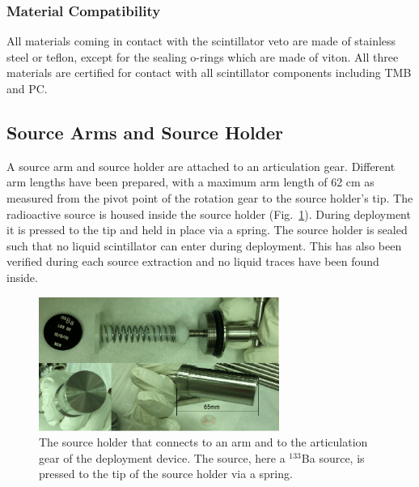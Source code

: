 \subsubsection*{Material Compatibility}
All materials coming in contact with the scintillator veto are made of stainless steel or teflon, except for the sealing o-rings which are made of viton. All three materials are certified for contact with all scintillator components including TMB and PC.

\subsection{Source Arms and Source Holder}
A source arm and source holder are attached to an articulation gear. Different arm lengths have been prepared, with a maximum arm length of 62 cm as measured from the pivot point of the rotation gear to the source holder's tip. The radioactive source is housed inside the source holder (Fig.~\ref{fig:SourceHolder}). During deployment it is pressed to the tip and held in place via a spring. The source holder is sealed such that no liquid scintillator can enter during deployment. This has also been verified during each source extraction and no liquid traces have been found inside.

\begin{figure}[htbp]
 \centering
  \includegraphics[width=0.7\textwidth]{Figures/SourceHolder.png}
  \caption{The source holder that connects to an arm and to the articulation gear of the deployment device. The source, here a $^{133}$Ba source, is pressed to the tip of the source holder via a spring.}
  \label{fig:SourceHolder}
\end{figure}
